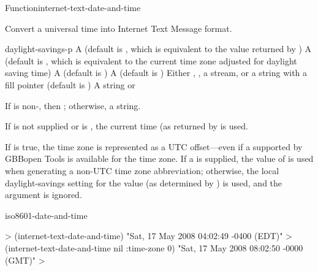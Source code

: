 \documentclass[10pt,twoside,english,pdftex]{article}
\begin{document}
\begin{functiondoc}{Function}{internet-text-date-and-time}{%
    }
% 

\fnsyntax

\fnpurpose Convert a universal time into Internet Text Message format.

\fnpackage {}

\fnmodule {}

\fnargs
\begin{args}{daylight-savings-p}
 A  (default is \nil,
  which is equivalent to the value returned by
  )
 A  (default is \nil,
  which is equivalent to the current time zone adjusted for daylight
  saving time)
 A  (default is \nil)         A  (default is \nil)
\arg[destination] Either \nil, , a stream, or a string with a fill 
pointer (default is \nil)
\arg[result] A string or \nil{}
\end{args}

\fnreturns If  is non-\nil, then \nil; otherwise, a string.

\fndescription
{}%
%
If  is not supplied or is \nil, the current time
(as returned by  is used.

\W{} 
%
If  is true, the time zone is represented as a UTC
offset---even if a  supported by
GBBopen Tools is available for the time zone. If a  is
supplied, the value of  is used when
generating a non-UTC time zone abbreviation; otherwise, the local
daylight-savings setting for the  value (as
determined by ) is used, and the
 argument is ignored.

\begin{alsos}{iso8601-date-and-time}
\end{alsos}

\fnexamples
%
\W\supp
\begin{example}
  > (internet-text-date-and-time)
  "Sat, 17 May 2008 04:02:49 -0400 (EDT)"
  > (internet-text-date-and-time nil :time-zone 0)
  "Sat, 17 May 2008 08:02:50 -0000 (GMT)"
  >
\end{example}

\end{functiondoc}
\end{document}

